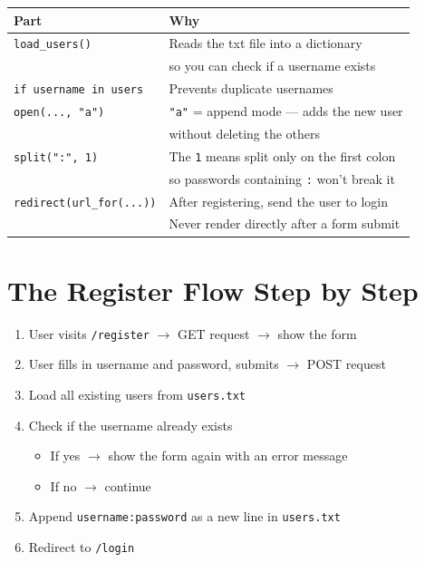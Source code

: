 \documentclass[12pt, a4paper]{article}
\begin{document}
\begin{center}
\begin{tabular}{ll}
\toprule
\textbf{Part} & \textbf{Why} \\
\midrule
\texttt{load\_users()} & Reads the txt file into a dictionary \\
                        & so you can check if a username exists \\
\addlinespace
\texttt{if username in users} & Prevents duplicate usernames \\
\addlinespace
\texttt{open(..., "a")} & \texttt{"a"} = append mode --- adds the new user \\
                         & without deleting the others \\
\addlinespace
\texttt{split(":", 1)} & The \texttt{1} means split only on the first colon \\
                        & so passwords containing \texttt{:} won't break it \\
\addlinespace
\texttt{redirect(url\_for(...))} & After registering, send the user to login \\
                                  & Never render directly after a form submit \\
\bottomrule
\end{tabular}
\end{center}

\section{The Register Flow Step by Step}

\begin{enumerate}
    \item User visits \texttt{/register} $\rightarrow$ GET request $\rightarrow$ show the form
    \item User fills in username and password, submits $\rightarrow$ POST request
    \item Load all existing users from \texttt{users.txt}
    \item Check if the username already exists
    \begin{itemize}
        \item If yes $\rightarrow$ show the form again with an error message
        \item If no $\rightarrow$ continue
    \end{itemize}
    \item Append \texttt{username:password} as a new line in \texttt{users.txt}
    \item Redirect to \texttt{/login}
\end{enumerate}
\end{document}
